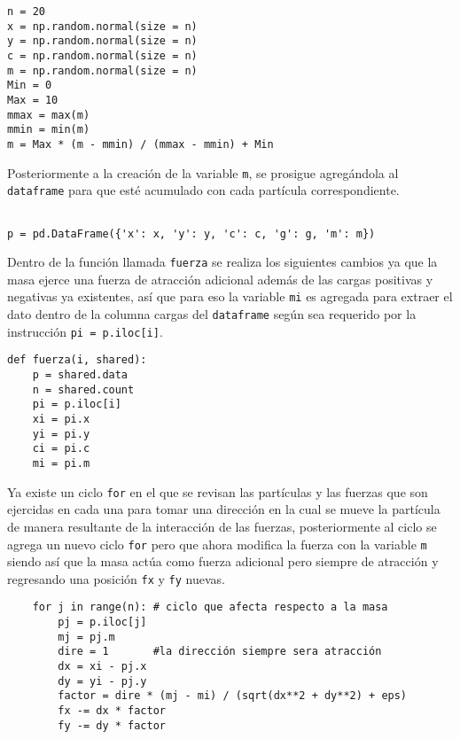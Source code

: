 \documentclass[a4paper, 11pt]{article}
\begin{document}
\begin{verbatim}
n = 20
x = np.random.normal(size = n)
y = np.random.normal(size = n)
c = np.random.normal(size = n)
m = np.random.normal(size = n)
Min = 0
Max = 10
mmax = max(m)
mmin = min(m)
m = Max * (m - mmin) / (mmax - mmin) + Min
\end{verbatim}

\bigskip
Posteriormente a la creación de la variable \texttt{m}, se prosigue agregándola al \texttt{dataframe} para que esté acumulado con cada partícula correspondiente. 
\begin{verbatim}

p = pd.DataFrame({'x': x, 'y': y, 'c': c, 'g': g, 'm': m})
\end{verbatim}

Dentro de la función llamada \texttt{fuerza} se realiza los siguientes cambios ya que la masa ejerce una fuerza de atracción adicional además de las cargas positivas y negativas ya existentes, así que para eso la variable \texttt{mi} es agregada para extraer el dato dentro de la columna cargas del \texttt{dataframe} según sea requerido por la instrucción \texttt{pi = p.iloc[i]}.
\begin{verbatim}
def fuerza(i, shared):
    p = shared.data
    n = shared.count
    pi = p.iloc[i]
    xi = pi.x
    yi = pi.y
    ci = pi.c
    mi = pi.m
\end{verbatim}

Ya existe un ciclo \texttt{for} en el que se revisan las partículas y las fuerzas que son ejercidas en cada una para tomar una dirección en la cual se mueve la partícula de manera resultante de la interacción de las fuerzas, posteriormente al ciclo se agrega un nuevo ciclo \texttt{for} pero que ahora modifica la fuerza con la variable \texttt{m} siendo así que la masa actúa como fuerza adicional pero siempre de atracción y regresando una posición \texttt{fx} y \texttt{fy} nuevas.
\begin{verbatim}
    for j in range(n): # ciclo que afecta respecto a la masa 
        pj = p.iloc[j]
        mj = pj.m
        dire = 1       #la dirección siempre sera atracción
        dx = xi - pj.x
        dy = yi - pj.y
        factor = dire * (mj - mi) / (sqrt(dx**2 + dy**2) + eps)
        fx -= dx * factor 
        fy -= dy * factor 
\end{verbatim}
\end{document}
